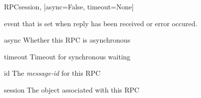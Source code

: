\documentclass[a4paper,10pt,english]{manual}
\begin{document}
\begin{classdesc}{RPC}{session, {[}async=False, timeout=None{]}}
\hypertarget{ncclient.operations.rpc.RPC.event}{}\begin{memberdesc}{event}
\href{http://docs.python.org/library/threading.html\#threading.Event}{} that is set when reply has been received or
error occured.
\end{memberdesc}

\hypertarget{ncclient.operations.rpc.RPC.async}{}\begin{memberdesc}{async}
Whether this RPC is asynchronous
\end{memberdesc}

\hypertarget{ncclient.operations.rpc.RPC.timeout}{}\begin{memberdesc}{timeout}
Timeout for synchronous waiting
\end{memberdesc}

\hypertarget{ncclient.operations.rpc.RPC.id}{}\begin{memberdesc}{id}
The \emph{message-id} for this RPC
\end{memberdesc}

\hypertarget{ncclient.operations.rpc.RPC.session}{}\begin{memberdesc}{session}
The \hyperlink{ncclient.transport.Session}{} object associated with this
RPC
\end{memberdesc}
\end{classdesc}
\end{document}
